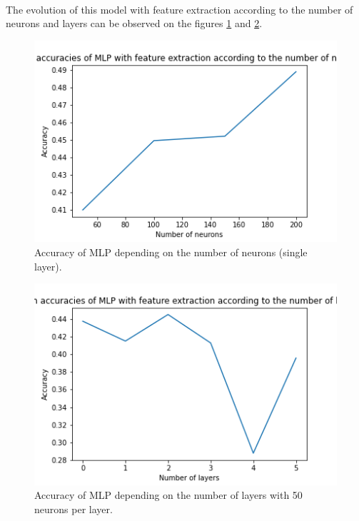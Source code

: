 \documentclass[a4paper, 11pt, oneside]{article}
\begin{document}
\paragraph{}The evolution of this model with feature extraction according to the number of neurons and layers can be observed on the figures \ref{fig:mlp-feature-extraction-neurons} and \ref{fig:mlp-feature-extraction-layers}.

\begin{figure}[H]
\centering
\includegraphics[scale=0.4]{mlp/MLP_feature_extraction_neurons.png}
\caption{Accuracy of MLP depending on the number of neurons (single layer).}
\label{fig:mlp-feature-extraction-neurons}
\end{figure}
    
\begin{figure}[H]
\centering
\includegraphics[scale=0.4]{mlp/MLP_feature_extraction_layers.png}
\caption{Accuracy of MLP depending on the number of layers with 50 neurons per layer.}
\label{fig:mlp-feature-extraction-layers}
\end{figure}
\end{document}
